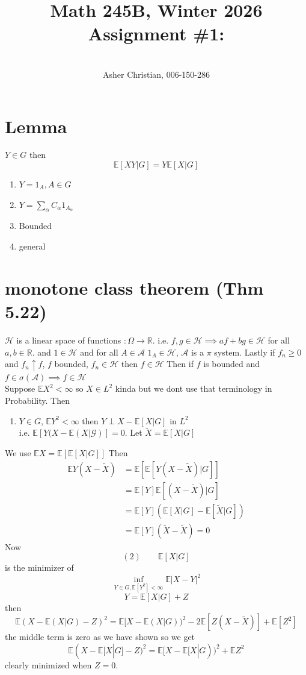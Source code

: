 \documentclass[11pt]{article}
\newcommand{\cnum}{Math 245B}
\newcommand{\ced}{Winter 2026}
\newcommand{\ctitle}[4]{\title{\vspace{-0.5in}\cnum, \ced\\Assignment #1: #2}\author{\vspace{-0.35in}\\#3, #4}}
\begin{document}
\ctitle{\#1}{}{Asher Christian}{006-150-286}
\date{}
\maketitle

\section{Lemma}
$Y \in G$ then 
 \[
     \mathbb{E}[XY | G] = Y \mathbb{E}[X | G]
\] 
\begin{enumerate}
    \item $Y = 1_A, A \in G$
    \item  $Y = \sum_{\alpha}^{}C_\alpha 1_{A_\alpha}$ 
    \item Bounded
    \item general
\end{enumerate}

\section{monotone class theorem (Thm 5.22)}
$\mathcal{H}$ is a  linear space of functions $: \Omega \rightarrow \mathbb{R}$.
i.e. $f,g \in \mathcal{H} \implies af + bg \in \mathcal{H}$ for all  $a,b \in \mathbb{R}$. and $1 \in \mathcal{H}$
and for all  $A \in \mathcal{A}$  $1_A \in \mathcal{H}$, $\mathcal{A}$ is a  $\pi$ system.
Lastly if $f_n \ge 0$ and  $f_n \uparrow f$,  $f$ bounded, $f_n \in \mathcal{H}$ then  $f \in \mathcal{H}$
Then if $f$ is bounded and   $f \in \sigma( \mathcal{A}) \implies f \in \mathcal{H}$ \\
Suppose $ \mathbb{E} X^2 < \infty$ so $X \in L^{2}$ kinda but we dont use that terminology in Probability.
Then
\begin{enumerate}
    \item $Y \in G$,  $ \mathbb{E} Y^2 < \infty$ then $Y \perp X - \mathbb{E}[X | G]$ in $L^{2}$ \\
        i.e. $ \mathbb{E}[Y (X - \mathbb{E}(X | \mathcal{G})] = 0$. Let $\tilde X = \mathbb{E}[X | G]$
\end{enumerate}
We use $ \mathbb{E}X = \mathbb{E}[ \mathbb{E}[X | G]]$
Then
\begin{align*}
    \mathbb{E}Y(X - \tilde X) &= \mathbb{E} [\mathbb{E}[Y(X -\tilde X)| G]]\\
    &= \mathbb{E}[Y] \mathbb{E}[(X-\tilde X)|G]\\
    &= \mathbb{E}[Y] ( \mathbb{E}[X | G] - \mathbb{E}[\tilde X | G])\\
    &= \mathbb{E}[Y] ( \tilde X - \tilde X) = 0
\end{align*}
Now
 \[
     (2) \qquad \mathbb{E}[X | G] 
\] 
is the minimizer of
\[
    \inf_{Y \in G, \mathbb{E}[Y^2] < \infty} \mathbb{E} |X-Y|^2
\] 
\[
    Y = \mathbb{E}[X | G] + Z
\] 
then
\[
    \mathbb{E}(X - \mathbb{E}(X | G) - Z)^2 = \mathbb{E}[X - \mathbb{E}(X | G))^2  -2 \mathbb{E}[Z (X - \tilde X)] + \mathbb{E}[Z^2]
\] 
the middle term is zero as we have shown so we get
\[
    \mathbb{E}(X - \mathbb{E}[X|G] - Z)^2 = \mathbb{E}[X - \mathbb{E}[X |G))^2 + \mathbb{E} Z^2
\] 
clearly minimized when $Z = 0$.
\end{document}
